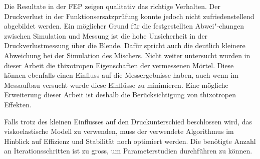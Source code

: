 Die Resultate in der FEP zeigen qualitativ das richtige Verhalten. Der Druckverlust in der Funktionsersatzprüfung konnte jedoch nicht zufriedenstellend abgebildet werden. 
Ein möglicher Grund für die festgestellten Abwei"-chungen zwischen Simulation und Messung ist die hohe Unsicherheit in der Druckverlustmessung über die Blende. Dafür spricht auch die deutlich kleinere Abweichung bei der Simulation des Mischers.
Nicht weiter untersucht wurden in dieser Arbeit die thixotropen Eigenschaften der vermessenen Mörtel. 
Diese können ebenfalls einen Einfluss auf die Messergebnisse haben, auch wenn im Messaufbau versucht wurde diese Einflüsse zu mi\-ni\-mie\-ren.
Eine mögliche Erweiterung dieser Arbeit ist deshalb die Berücksichtigung von thixotropen Effekten.

Falls trotz des kleinen Einflusses auf den Druckunterschied beschlossen wird, das viskoelastische Modell zu verwenden, muss der verwendete Algorithmus im Hinblick auf Effizienz und Stabilität noch optimiert werden. Die benötigte Anzahl an Iterationsschritten ist zu gross, um Parameterstudien durchführen zu können.

